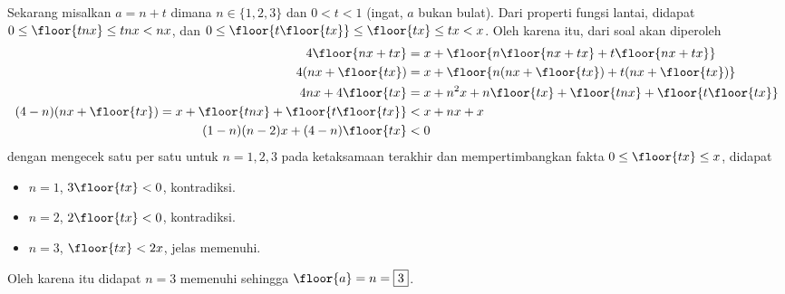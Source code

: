     Sekarang misalkan $a = n + t$ dimana $n \in \{1,2,3\}$ dan $0 < t < 1$ (ingat, $a$ bukan bulat). Dari properti fungsi lantai, didapat $0 \le \floor{tnx} \le tnx < nx$, dan $0 \le \floor{t\floor{tx}} \le \floor{tx} \le tx < x$. Oleh karena itu, dari soal akan diperoleh
    \begin{align*}
        4\floor{nx+tx} &= x + \floor{n\floor{nx+tx}+t\floor{nx+tx}}\\
        4(nx+\floor{tx}) &= x + \floor{n(nx+\floor{tx})+t(nx+\floor{tx})}\\
        4nx + 4\floor{tx} &= x + n^2x + n\floor{tx} + \floor{tnx} + \floor{t\floor{tx}}\\
        (4-n)(nx+\floor{tx}) = x + \floor{tnx} + \floor{t\floor{tx}}&<x+nx+x\\
        (1-n)(n-2)x+(4-n)\floor{tx}&<0
    \end{align*}
    dengan mengecek satu per satu untuk $n=1,2,3$ pada ketaksamaan terakhir dan mempertimbangkan fakta $0 \le \floor{tx} \le x$, didapat
    \begin{itemize}
        \item $n=1$, $3\floor{tx} < 0$, kontradiksi.
        \item $n=2$, $2\floor{tx} < 0$, kontradiksi.
        \item $n=3$, $\floor{tx} < 2x$, jelas memenuhi.
    \end{itemize}
    Oleh karena itu didapat $n=3$ memenuhi sehingga $\floor{a} = n = \boxed{3}$.
